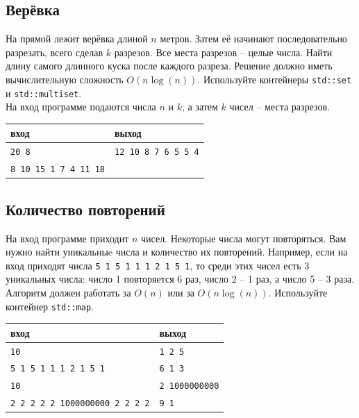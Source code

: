 \documentclass{article}
\begin{document}
\subsection{Верёвка}
На прямой лежит верёвка длиной $n$ метров. Затем её начинают последовательно разрезать, всего сделав $k$ разрезов. Все места разрезов -- целые числа. Найти длину самого длинного куска после каждого разреза. Решение должно иметь вычислительную сложность $O(n \log(n))$. Используйте контейнеры \texttt{std::set} и \texttt{std::multiset}.\\
На вход программе подаются числа $n$ и $k$, а затем $k$ чисел -- места разрезов.
\begin{center}
\begin{tabular}{ l | l }
 вход & выход \\ \hline
 \texttt{20 8} & \texttt{12 10 8 7 6 5 5 4}  \\ 
 \texttt{8 10 15 1 7 4 11 18} &  \\
\end{tabular}
\end{center}

\newpage
\subsection{Количество повторений}
На вход программе приходит $n$ чисел. Некоторые числа могут повторяться. Вам нужно найти уникальныe числа и количество их повторений. Например, если на вход приходят числа \texttt{5 1 5 1 1 1 2 1 5 1}, то среди этих чисел есть 3 уникальных числа: число 1 повторяется 6 раз, число 2 -- 1 раз, а число 5 -- 3 раза. Алгоритм должен работать за $O(n)$ или за $O(n \log(n))$. Используйте контейнер \texttt{std::map}.

\begin{center}
\begin{tabular}{ l | l }
 вход & выход \\ \hline
 \texttt{10} & \texttt{1 2 5}\\
 \texttt{5 1 5 1 1 1 2 1 5 1} & \texttt{6 1 3} \\ \hline
 \texttt{10} & \texttt{2 1000000000}\\
 \texttt{2 2 2 2 2 1000000000 2 2 2 2} & \texttt{9 1} \\
\end{tabular}
\end{center}
\end{document}
